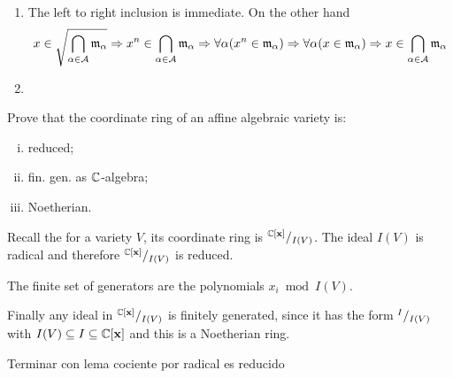 \documentclass[12pt]{memoir}
\begin{document}
\begin{ptcbp}
\begin{enumerate}
  \item The left to right inclusion is immediate. On the other hand 
  $$x\in\sqrt{\bigcap_{\alpha\in\mathcal{A}}\mathfrak{m}_\alpha}\Rightarrow x^n\in \bigcap_{\alpha\in\mathcal{A}}\mathfrak{m}_\alpha\Rightarrow\forall \alpha(x^n\in\mathfrak{m}_\alpha)\Rightarrow\forall \alpha(x\in\mathfrak{m}_\alpha)\Rightarrow x\in\bigcap_{\alpha\in\mathcal{A}}\mathfrak{m}_\alpha$$
  \item 
\end{enumerate}
\end{ptcbp}

\begin{Ej}
  Prove that the coordinate ring of an affine algebraic variety is:
  \vspace*{-0.4em}
  \begin{enumerate}[i)]
    \itemsep=-0.4em
    \item reduced;
    \item fin. gen. as $\mathbb{C}$-algebra;
    \item Noetherian.
  \end{enumerate}
\end{Ej}

\begin{ptcbr}
  Recall the for a variety $V$, its coordinate ring is $\quot{\bC[\vec x]}{I(V)}$. The ideal $I(V)$ is radical and therefore $\quot{\bC[\vec x]}{I(V)}$ is reduced.\par 
  The finite set of generators are the polynomials $x_i\bmod I(V)$.\par 
  Finally any ideal in $\quot{\bC[\vec x]}{I(V)}$ is finitely generated, since it has the form $\quot{I}{I(V)}$ with $I(V)\subseteq I\subseteq \mathbb{C}[\mathbf{x}]$ and this is a Noetherian ring.
\end{ptcbr}

Terminar con lema cociente por radical es reducido
\end{document}
